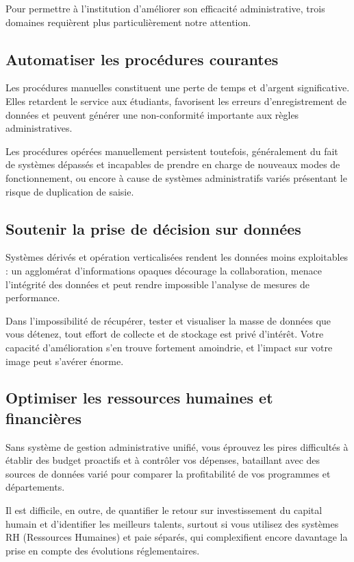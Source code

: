 Pour permettre à l'institution d'améliorer son efficacité administrative, trois domaines requièrent plus particulièrement notre attention.

\subsection{Automatiser les procédures courantes}
Les procédures manuelles constituent une perte de temps et d'argent significative. Elles retardent le service aux étudiants, favorisent les erreurs d'enregistrement de données et peuvent générer une non-conformité importante aux règles administratives.
\medskip

Les procédures opérées manuellement persistent toutefois, généralement du fait de systèmes dépassés et incapables de prendre en charge de nouveaux modes de fonctionnement, ou encore à cause de systèmes administratifs variés présentant le risque de duplication de saisie.

\subsection{Soutenir la prise de décision sur données}
Systèmes dérivés et opération verticalisées rendent les données moins exploitables : un agglomérat d'informations opaques décourage la collaboration, menace l'intégrité des données et peut rendre impossible l'analyse de mesures de performance.
\medskip

Dans l'impossibilité de récupérer, tester et visualiser la masse de données que vous détenez, tout effort de collecte et de stockage est privé d'intérêt. Votre capacité d'amélioration s'en trouve fortement amoindrie, et l'impact sur votre image peut s'avérer énorme.

\subsection{Optimiser les ressources humaines et financières}
Sans système de gestion administrative unifié, vous éprouvez les pires difficultés à établir des budget proactifs et à contrôler vos dépenses, bataillant avec des sources de données varié pour comparer la profitabilité de vos programmes et départements.
\medskip

Il est difficile, en outre, de quantifier le retour sur investissement du capital humain et d'identifier les meilleurs talents, surtout si vous utilisez des systèmes RH (Ressources Humaines) et paie séparés, qui complexifient encore davantage la prise en compte des évolutions réglementaires.

